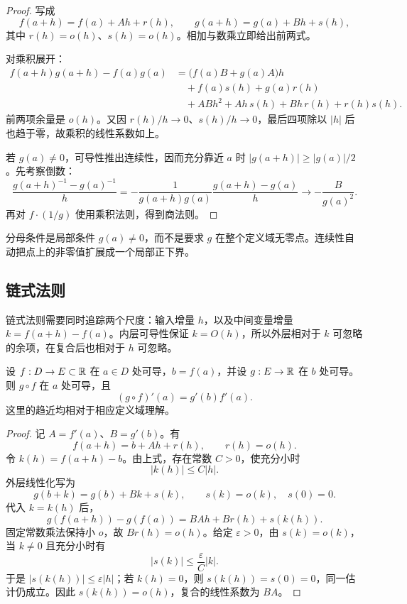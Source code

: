 \begin{proof}
写成
\[
 f(a+h)=f(a)+Ah+r(h),\qquad
 g(a+h)=g(a)+Bh+s(h),
\]
其中 \(r(h)=o(h)\)、\(s(h)=o(h)\)。相加与数乘立即给出前两式。

对乘积展开：
\begin{align*}
 f(a+h)g(a+h)-f(a)g(a)
 &=\bigl(f(a)B+g(a)A\bigr)h\\
 &\quad+f(a)s(h)+g(a)r(h)\\
 &\quad+ABh^2+Ah\,s(h)+Bh\,r(h)+r(h)s(h).
\end{align*}
前两项余量是 \(o(h)\)。又因 \(r(h)/h\to0\)、\(s(h)/h\to0\)，最后四项除以 \(|h|\) 后也趋于零，故乘积的线性系数如上。

若 \(g(a)\ne0\)，可导性推出连续性，因而充分靠近 \(a\) 时 \(|g(a+h)|\ge |g(a)|/2\)。先考察倒数：
\[
 \frac{g(a+h)^{-1}-g(a)^{-1}}h
 =-\frac1{g(a+h)g(a)}
   \frac{g(a+h)-g(a)}h
 \longrightarrow-\frac{B}{g(a)^2}.
\]
再对 \(f\cdot(1/g)\) 使用乘积法则，得到商法则。
\end{proof}

分母条件是局部条件 \(g(a)\ne0\)，而不是要求 \(g\) 在整个定义域无零点。连续性自动把点上的非零值扩展成一个局部正下界。

\subsection{链式法则}

链式法则需要同时追踪两个尺度：输入增量 \(h\)，以及中间变量增量 \(k=f(a+h)-f(a)\)。内层可导性保证 \(k=O(h)\)，所以外层相对于 \(k\) 可忽略的余项，在复合后也相对于 \(h\) 可忽略。

\begin{theorem}[一元链式法则]
\label{thm:one-dimensional-chain-rule}
设 \(f:D\to E\subset\mathbb{R}\) 在 \(a\in D\) 处可导，\(b=f(a)\)，并设 \(g:E\to\mathbb{R}\) 在 \(b\) 处可导。则 \(g\circ f\) 在 \(a\) 处可导，且
\[
 (g\circ f)'(a)=g'(b)f'(a).
\]
这里的趋近均相对于相应定义域理解。
\end{theorem}

\begin{proof}
记 \(A=f'(a)\)、\(B=g'(b)\)。有
\[
 f(a+h)=b+Ah+r(h),\qquad r(h)=o(h).
\]
令 \(k(h)=f(a+h)-b\)。由上式，存在常数 \(C>0\)，使充分小时
\[
 |k(h)|\le C|h|.
\]
外层线性化写为
\[
 g(b+k)=g(b)+Bk+s(k),\qquad s(k)=o(k),\quad s(0)=0.
\]
代入 \(k=k(h)\) 后，
\[
 g(f(a+h))-g(f(a))
 =BAh+B r(h)+s(k(h)).
\]
固定常数乘法保持小 \(o\)，故 \(B r(h)=o(h)\)。给定 \(\varepsilon>0\)，由 \(s(k)=o(k)\)，当 \(k\ne0\) 且充分小时有
\[
 |s(k)|\le \frac{\varepsilon}{C}|k|.
\]
于是 \(|s(k(h))|\le\varepsilon|h|\)；若 \(k(h)=0\)，则 \(s(k(h))=s(0)=0\)，同一估计仍成立。因此 \(s(k(h))=o(h)\)，复合的线性系数为 \(BA\)。
\end{proof}


